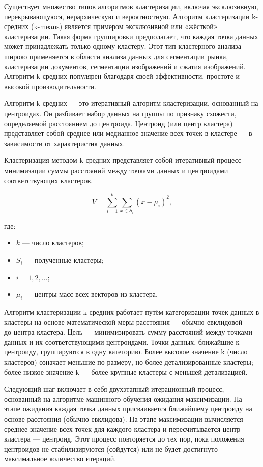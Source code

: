 Существует множество типов алгоритмов кластеризации, включая эксклюзивную, перекрывающуюся, иерархическую и вероятностную. Алгоритм кластеризации k-средних (k-means) является примером эксклюзивной или «жёсткой» кластеризации. Такая форма группировки предполагает, что каждая точка данных может принадлежать только одному кластеру. Этот тип кластерного анализа широко применяется в области анализа данных для сегментации рынка, кластеризации документов, сегментации изображений и сжатия изображений. Алгоритм k-средних популярен благодаря своей эффективности, простоте и высокой производительности.

Алгоритм k-средних — это итеративный алгоритм кластеризации, основанный на центроидах. Он разбивает набор данных на группы по признаку схожести, определяемой расстоянием до центроида. Центроид (или центр кластера) представляет собой среднее или медианное значение всех точек в кластере — в зависимости от характеристик данных.

Кластеризация методом k-средних представляет собой итеративный процесс минимизации суммы расстояний между точками данных и центроидами соответствующих кластеров.

\begin{equation}
V = \sum_{i=1}^{k} \sum_{x \in S_i} (x - \mu_i)^2,
\end{equation}

где:
\begin{itemize}

\item $k$ — число кластеров;
\item $S_i$ — полученные кластеры;
\item $i = 1,2,\ldots$;
\item $\mu_i$ — центры масс всех векторов из кластера.
\end{itemize}


Алгоритм кластеризации k-средних работает путём категоризации точек данных в кластеры на основе математической меры расстояния — обычно евклидовой — до центра кластера. Цель — минимизировать сумму расстояний между точками данных и их соответствующими центроидами. Точки данных, ближайшие к центроиду, группируются в одну категорию. Более высокое значение k (число кластеров) означает меньшие по размеру, но более детализированные кластеры; более низкое значение k — более крупные кластеры с меньшей детализацией.

Следующий шаг включает в себя двухэтапный итерационный процесс, основанный на алгоритме машинного обучения ожидания-максимизации. На этапе ожидания каждая точка данных присваивается ближайшему центроиду на основе расстояния (обычно евклидова). На этапе максимизации вычисляется среднее значение всех точек для каждого кластера и пересчитывается центр кластера — центроид. Этот процесс повторяется до тех пор, пока положения центроидов не стабилизируются (сойдутся) или не будет достигнуто максимальное количество итераций.

